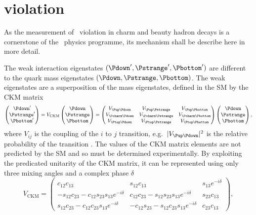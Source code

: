 \section{\texorpdfstring{\CP}{CP} violation}

As the measurement of \CP\ violation in charm and beauty hadron decays is a 
cornerstone of the \lhcb\ physics programme, its mechanism shall be describe 
here in more detail.

The weak interaction eigenstates $(\Pdown', \Pstrange', \Pbottom')$ 
are different to the quark mass eigenstates $(\Pdown, \Pstrange, \Pbottom)$.
The weak eigenstates are a superposition of the mass eigenstates, defined in 
the SM by the \ac{CKM} matrix
\begin{equation}
  \begin{pmatrix} \Pdown' \\ \Pstrange' \\ \Pbottom' \end{pmatrix}
  =
  V_{\text{CKM}}\begin{pmatrix} \Pdown \\ \Pstrange \\ \Pbottom \end{pmatrix}
  =
  \begin{pmatrix}
    \Vud & \Vus & \Vub \\
    \Vcd & \Vcs & \Vcb \\
    \Vtd & \Vts & \Vtb
  \end{pmatrix}
  \begin{pmatrix} \Pdown \\ \Pstrange \\ \Pbottom \end{pmatrix},
\end{equation}
where $V_{ij}$ is the coupling of the $i$ to $j$ transition, e.g.\ $|\Vud|^{2}$ is 
the relative probability of the transition \decay{\Pdown}{\Pup}.
The values of the \ac{CKM} matrix elements are not predicted by the \ac{SM} and 
so must be determined experimentally.
By exploiting the predicated unitarity of the \ac{CKM} matrix, it can be 
represented using only three mixing angles and a complex phase $\delta$
\begin{equation}
  V_{\textrm{CKM}} =
  \begin{pmatrix}
    c_{12}c_{13} & s_{12}c_{13} & s_{13}e^{-i\delta} \\
    -s_{12}c_{23} - c_{12}s_{23}s_{13}e^{-i\delta} & c_{12}c_{23} - s_{12}s_{23}s_{13}e^{-i\delta} & s_{23}c_{13} \\
    s_{12}c_{23} - c_{12}c_{23}s_{13}e^{-i\delta} & -c_{12}s_{23} - s_{12}c_{23}s_{13}e^{-i\delta} & c_{23}c_{13}
  \end{pmatrix},
\end{equation}
